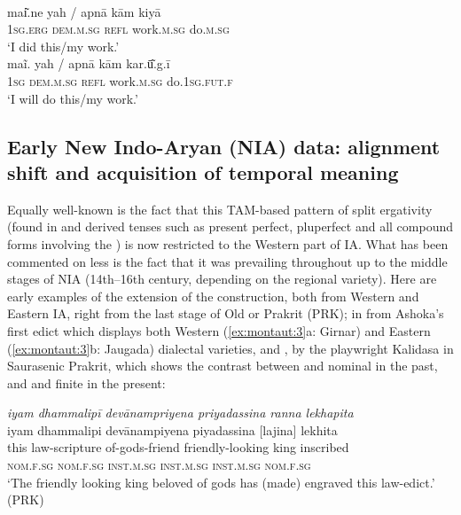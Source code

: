 \documentclass[output=paper]{langsci/langscibook}
\begin{document}
\ea
\label{ex:montaut:2}
\ea 
{}\\
\gll mai͂.ne      yah    /    apnā   kām kiyā\\
 \textsc{1sg.erg} \textsc{dem.m.sg}  {}   \textsc{refl}     work.\textsc{m.sg}     do.\textsc{m.sg} \\
\glt ‘I did this\slash my work.’
\ex 
{}\\
\gll maĩ.  yah      /    apnā   kām        kar.ū͂.g.ī\\
\textsc{1sg}  \textsc{dem.m.sg} {} \textsc{refl}    work.\textsc{m.sg}   do.\textsc{1sg.fut.f} \\
\glt ‘I will do this\slash my work.’ 
\z 
\z


\subsection{Early New Indo-Aryan (NIA) data: alignment shift and acquisition of temporal meaning}\label{sec:montaut:2.1}

Equally well-known is the fact that this TAM-based pattern of split ergativity (found in  and derived tenses such as present perfect, pluperfect and all compound forms involving the ) is now restricted to the Western part of IA. What has been commented on less is the fact that it was prevailing throughout  up to the middle stages of NIA (14th--16th century, depending on the regional variety). Here are early examples of the extension of the construction, both from Western and Eastern IA, right from the last stage of Old  or Prakrit (PRK); in  from Ashoka’s first edict which displays both Western (\ref{ex:montaut:3}a: Girnar) and Eastern (\ref{ex:montaut:3}b: Jaugada) dialectal varieties, and , by the playwright Kalidasa in Saurasenic Prakrit, which shows the contrast between  and nominal  in the past, and  and finite  in the present: 

\ea
\label{ex:montaut:3}
\ea 
\textit{iyam dhammalipī devānampriyena     priyadassina       ranna   lekhapita} \\
\ex 
\glll iyam   dhammalipi   devānampiyena    piyadassina         [lajina]  lekhita\\
this  law-scripture    of-gods-friend    friendly-looking  king     inscribed \\
\textsc{nom.f.sg}  \textsc{nom.f.sg}     \textsc{inst.m.sg}      \textsc{inst.m.sg}     \textsc{inst.m.sg}  \textsc{nom.f.sg} \\
\glt ‘The friendly looking king beloved of gods has (made) engraved this law-edict.’  (PRK)
\z 
\z 
\end{document}
